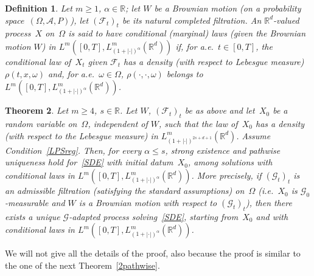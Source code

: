 \documentclass[a4paper,10pt]{article}
\newtheorem{theorem}{Theorem}[section]
\newtheorem{definition}[theorem]{Definition}
\newcommand\1{\mathbbm{1}}
\newcommand{\mc}{\mathcal}
\numberwithin{equation}{section}
\begin{document}
\begin{definition}\label{1defpathw}
Let $m \geq 1$, $\alpha\in\mathbb{R}$; let $W$ be a Brownian motion \textup{(}on a probability space~$(\Omega,\mc{A},P)$\textup{)}, let $(\mc{F}_t)_t$ be its natural completed filtration. An $\mathbb{R}^d$-valued process~$X$ on~$\Omega$ is said to have \emph{conditional \textup{(}marginal\textup{)} laws} \textup{(}given the Brownian motion $W$\textup{)} \emph{in $L^m([0,T],L^m_{(1+|\cdot|)^{\alpha}}(\mathbb{R}^d))$} if, for a.e.~$t \in [0,T]$, the conditional law of~$X_t$ given $\mc{F}_t$ has a density \textup{(}with respect to Lebesgue measure\textup{)} $\rho(t,x,\omega)$ and, for a.e.~$\omega \in \Omega$, $\rho(\cdot,\cdot,\omega)$ belongs to $L^m([0,T],L^m_{(1+|\cdot|)^{\alpha}}(\mathbb{R}^d))$.
\end{definition}

\begin{theorem}\label{1pathuniq}
Let $m\ge4$, $s\in\mathbb{R}$. Let $W$, $(\mc{F}_t)_t$ be as above and let~$X_0$ be a random variable on~$\Omega$, independent of $W$, such that the law of~$X_0$ has a density \textup{(}with respect to the Lebesgue measure\textup{)} in $L^m_{(1+|\cdot|)^{2s+d+1}}(\mathbb{R}^d)$. Assume Condition~\ref{LPSreg}. Then, for every $\alpha\le s$, strong existence and pathwise uniqueness hold for~\eqref{SDE} with initial datum~$X_0$, among solutions with conditional laws in $L^m([0,T],L^m_{(1+|\cdot|)^{\alpha}}(\mathbb{R}^d))$. More precisely, if $(\mc{G}_t)_t$ is an admissible filtration \textup{(}satisfying the standard assumptions\textup{)} on~$\Omega$ \textup{(}i.e.~$X_0$ is $\mc{G}_0$-measurable and $W$ is a Brownian motion with respect to $(\mc{G}_t)_t$\textup{)}, then there exists a unique $\mc{G}$-adapted process solving~\eqref{SDE}, starting from~$X_0$ and with conditional laws in $L^m([0,T],L^m_{(1+|\cdot|)^{\alpha}}(\mathbb{R}^d))$.
\end{theorem}

We will not give all the details of the proof, also because the proof is similar to the one of the next Theorem~\ref{2pathwise}.
\end{document}
